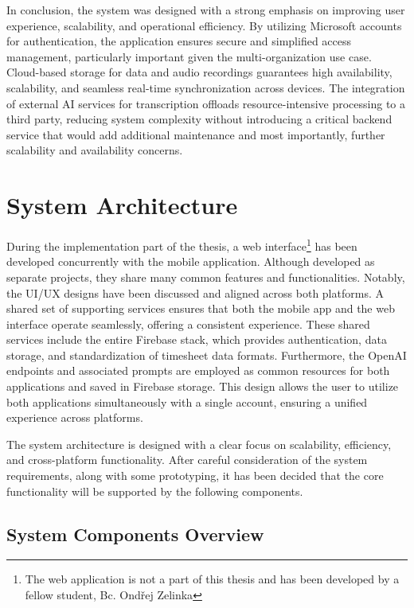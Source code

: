 \documentclass[
  digital,     %
  oneside,     %
  nosansbold,  %
  nocolorbold, %
  lof,         %
  lot,         %
]{fithesis4}
\begin{document}
\begin{markdown}
In conclusion, the system was designed with a strong emphasis on improving user experience, scalability, and operational efficiency. By utilizing Microsoft accounts for authentication, the application ensures secure and simplified access management, particularly important given the multi-organization use case. Cloud-based storage for data and audio recordings guarantees high availability, scalability, and seamless real-time synchronization across devices. The integration of external AI services for transcription offloads resource-intensive processing to a third party, reducing system complexity without introducing a critical backend service that would add additional maintenance and most importantly, further scalability and availability concerns.

\end{markdown}

\section{System Architecture}

During the implementation part of the thesis, a web interface\footnote{The web application is not a part of this thesis and has been developed by a fellow student, Bc. Ondřej Zelinka} has been developed concurrently with the mobile application. Although developed as separate projects, they share many common features and functionalities. Notably, the UI/UX designs have been discussed and aligned across both platforms. A shared set of supporting services ensures that both the mobile app and the web interface operate seamlessly, offering a consistent experience. These shared services include the entire Firebase stack, which provides authentication, data storage, and standardization of timesheet data formats. Furthermore, the OpenAI endpoints and associated prompts are employed as common resources for both applications and saved in Firebase storage. This design allows the user to utilize both applications simultaneously with a single account, ensuring a unified experience across platforms.

The system architecture is designed with a clear focus on scalability, efficiency, and cross-platform functionality. After careful consideration of the system requirements, along with some prototyping, it has been decided that the core functionality will be supported by the following components.

\subsection{System Components Overview}
\end{document}
